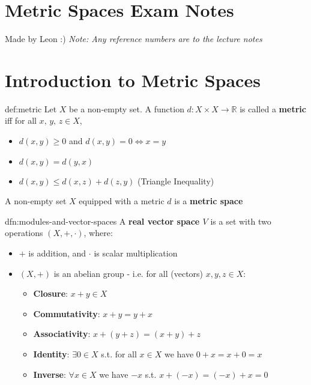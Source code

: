 \documentclass[landscape, 8pt]{extarticle}
\begin{document}
\setlength{\abovedisplayskip}{3.5pt}
\setlength{\belowdisplayskip}{3.5pt}
\setlength{\abovedisplayshortskip}{3.5pt}
\setlength{\belowdisplayshortskip}{3.5pt}

\begin{multicols}{3}
\raggedcolumns


\section*{\huge Metric Spaces Exam Notes}
Made by Leon :) \textit{Note: Any reference numbers are to the lecture notes}

\vspace{-5pt}
\section{Introduction to Metric Spaces}

\begin{thm}{def:metric}{}
    \vspace{-5pt}
    Let $X$ be a non-empty set. A function $d: X \times X \to \mathbb{R} $ is called a \textbf{metric} iff for all $x,\,y,\,z\in X$,
    \vspace{-3pt}
    \begin{itemize}
        \item $d(x,y)\ge 0$ and $d(x,y)=0 \iff x = y$
        \item $d(x,y)=d(y,x)$
        \item $d(x,y)\le d(x,z)+d(z,y)$ (Triangle Inequality)
    \end{itemize}
    A non-empty set $X$ equipped with a metric $d$ is a \textbf{metric space}
\end{thm}

\vspace{-5pt}
\begin{dfn}{dfn:modules-and-vector-spaces}{}
    \vspace{-5pt}
    A \textbf{real vector space $V$} is a set with two operations $(X, +, \cdot)$, where:
    \vspace{-10pt}
    \begin{itemize}[leftmargin=*]
        \item $+$ is addition, and $\cdot$ is scalar multiplication
        \item $(X, +)$ is an abelian group - i.e. for all (vectors) $x,y,z\in X$:
            \vspace{-2pt}
            \begin{itemize}
                \item \textbf{Closure}: $x + y\in X$
                \item \textbf{Commutativity}: $x + y = y + x$
                \item \textbf{Associativity}: $x + (y + z) = (x + y) + z$
                \item \textbf{Identity}: $\exists 0\in X$ s.t. for all $x\in X$ we have $0 + x = x + 0 = x$
                \item \textbf{Inverse}: $\forall x\in X$ we have $-x$ s.t. $x + (-x) = (-x) + x = 0$
            \end{itemize}
            

\end{itemize}
\end{dfn}
\end{multicols}
\end{document}
